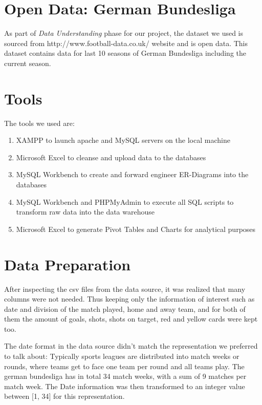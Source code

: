 \documentclass[11pt, journal]{IEEEtran}
\begin{document}
\section{Open Data: German Bundesliga } \label{sec:dataunderstanding}
As part of \emph{Data Understanding}  phase for our project, the dataset we used is sourced from http://www.football-data.co.uk/ website and is open data. This dataset contains data for last 10 seasons of German Bundesliga including the current season.
\section{Tools} \label{sec:concept}
The tools we used are: 
\begin{enumerate}
\item XAMPP to launch apache and MySQL servers on the local machine
\item Microsoft Excel to cleanse and upload data to the databases
\item MySQL Workbench to create and forward engineer ER-Diagrams into the databases
\item MySQL Workbench and PHPMyAdmin to execute all SQL scripts to transform raw data into the data warehouse
\item Microsoft Excel to generate Pivot Tables and Charts for analytical purposes
\end{enumerate}
 
\section{Data Preparation} \label{sec:impl}
After inspecting the csv files from the data source, it was realized that many columns were not needed. Thus keeping only
the information of interest such as date and division of the match played, home and away team, and for both of them the amount of goals,
shots, shots on target, red and yellow cards were kept too.

The date format in the data source didn't match the representation we preferred to talk about: Typically sports leagues are distributed into 
match weeks or rounds, where teams get to face one team per round and all teams play. The german bundesliga has in total 34 match weeks, with a
sum of 9 matches per match week. The Date information was then transformed to an integer value between [1, 34] for this representation.
\end{document}
